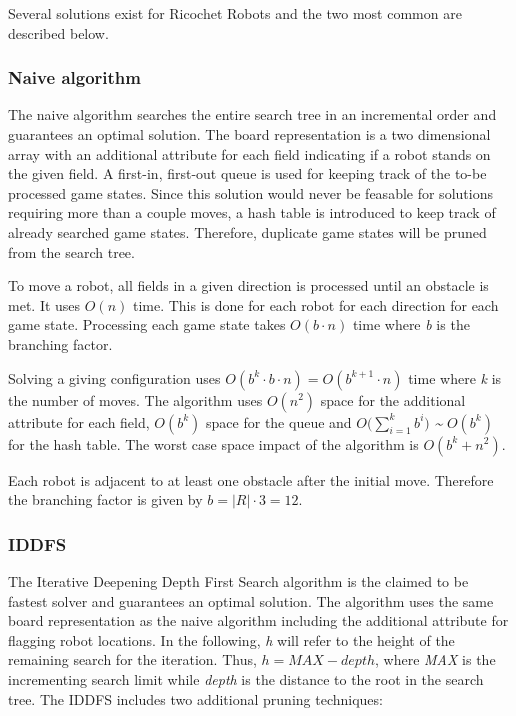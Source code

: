 \documentclass[]{article}
\begin{document}
Several solutions exist for Ricochet Robots and the two most common are
described below.

\subsubsection{Naive algorithm}\label{naive-algorithm}

The naive algorithm searches the entire search tree in an incremental
order and guarantees an optimal solution. The board representation is a
two dimensional array with an additional attribute for each field
indicating if a robot stands on the given field. A first-in, first-out
queue is used for keeping track of the to-be processed game states.
Since this solution would never be feasable for solutions requiring more
than a couple moves, a hash table is introduced to keep track of already
searched game states. Therefore, duplicate game states will be pruned
from the search tree.

To move a robot, all fields in a given direction is processed until an
obstacle is met. It uses \(O(n)\) time. This is done for each robot for
each direction for each game state. Processing each game state takes
\(O(b \cdot n)\) time where \emph{b} is the branching factor.

Solving a giving configuration uses
\(O(b^k \cdot b \cdot n) = O(b^{k+1} \cdot n)\) time where \emph{k} is
the number of moves. The algorithm uses \(O(n^2)\) space for the
additional attribute for each field, \(O(b^k)\) space for the queue and
\(O \Big(\sum\limits_{i=1}^k b^i \Big)\) \emph{\textasciitilde{}}
\(O(b^k)\) for the hash table. The worst case space impact of the
algorithm is \(O(b^k + n^2)\).

Each robot is adjacent to at least one obstacle after the initial move.
Therefore the branching factor is given by \(b = |R| \cdot 3 = 12\).

\subsubsection{IDDFS}\label{iddfs}

The Iterative Deepening Depth First Search algorithm is the claimed to
be fastest solver and guarantees an optimal solution. The algorithm uses
the same board representation as the naive algorithm including the
additional attribute for flagging robot locations. In the following,
\emph{h} will refer to the height of the remaining search for the
iteration. Thus, \(h = MAX - depth\), where \emph{MAX} is the
incrementing search limit while \emph{depth} is the distance to the root
in the search tree. The IDDFS includes two additional pruning
techniques:
\end{document}
